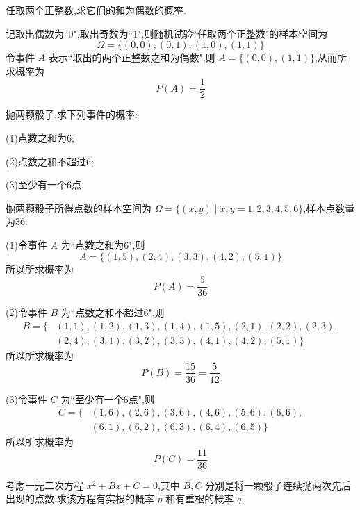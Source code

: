 \question 任取两个正整数,求它们的和为偶数的概率.

\begin{solution}
    记取出偶数为``0",取出奇数为``1",则随机试验``任取两个正整数"的样本空间为
    $$
    \varOmega = \{ (0,0), (0,1), (1,0), (1,1) \}
    $$
    令事件 $A$ 表示``取出的两个正整数之和为偶数",则 $A = \{ (0,0), (1,1) \}$,从而所求概率为 $$P(A) = \dfrac{1}{2}$$
\end{solution}

\question 抛两颗骰子,求下列事件的概率:

(1)点数之和为6;

(2)点数之和不超过6;

(3)至少有一个6点.

\begin{solution}
    抛两颗骰子所得点数的样本空间为 $\varOmega = \{ (x,y) \mid x,y=1,2,3,4,5,6 \}$,样本点数量为36.

    (1)令事件 $A$ 为``点数之和为6",则
    $$
    A = \{ (1,5), (2,4), (3,3), (4,2), (5,1) \}
    $$
    所以所求概率为
    $$
    P(A) = \dfrac{5}{36}
    $$

    (2)令事件 $B$ 为``点数之和不超过6",则
    $$
    \begin{aligned}
        B = \{ & (1,1), (1,2), (1,3), (1,4), (1,5), (2,1), (2,2), (2,3), \\
        & (2,4), (3,1), (3,2), (3,3), (4,1), (4,2), (5,1) \}
    \end{aligned}
    $$
    所以所求概率为
    $$
    P(B) = \dfrac{15}{36} = \dfrac{5}{12}
    $$

    (3)令事件 $C$ 为``至少有一个6点",则
    $$
    \begin{aligned}
        C = \{ & (1,6), (2,6), (3,6), (4,6), (5,6), (6,6), \\
        & (6,1), (6,2), (6,3), (6,4), (6,5) \}
    \end{aligned}
    $$
    所以所求概率为
    $$
    P(C) = \dfrac{11}{36}
    $$
\end{solution}

\question 考虑一元二次方程 $x^2 + Bx + C = 0$,其中 $B,C$ 分别是将一颗骰子连续抛两次先后出现的点数,求该方程有实根的概率 $p$ 和有重根的概率 $q$.

